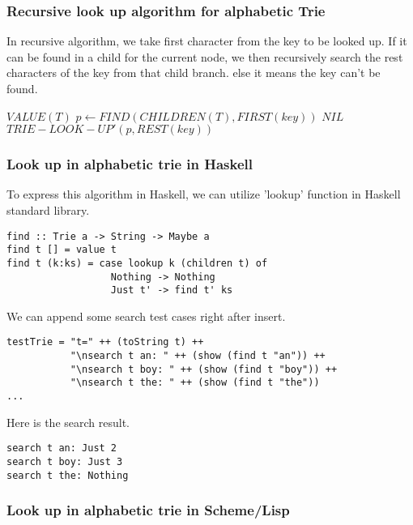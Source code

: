 \documentclass{article}
\begin{document}
\subsubsection{Recursive look up algorithm for alphabetic Trie}

In recursive algorithm, we take first character from the key to be
looked up. If it can be found in a child for the current node, we then
recursively search the rest characters of the key from that child
branch. else it means the key can't be found.

\begin{algorithmic}[1]
    \State \Return $VALUE(T)$
  \EndIf
  \State $p \leftarrow FIND(CHILDREN(T), FIRST(key))$
    \State \Return $NIL$
  \Else
    \State \Return $TRIE-LOOK-UP'(p, REST(key))$
  \EndIf
\EndFunction
\end{algorithmic}

\subsubsection*{Look up in alphabetic trie in Haskell}
To express this algorithm in Haskell, we can utilize 'lookup' function
in Haskell standard library\cite{wiki-trie}.

\lstset{language=Haskell}
\begin{lstlisting}
find :: Trie a -> String -> Maybe a
find t [] = value t
find t (k:ks) = case lookup k (children t) of
                  Nothing -> Nothing
                  Just t' -> find t' ks
\end{lstlisting}

We can append some search test cases right after insert.

\begin{lstlisting}
testTrie = "t=" ++ (toString t) ++
           "\nsearch t an: " ++ (show (find t "an")) ++
           "\nsearch t boy: " ++ (show (find t "boy")) ++
           "\nsearch t the: " ++ (show (find t "the"))
...
\end{lstlisting}

Here is the search result.

\begin{verbatim}
search t an: Just 2
search t boy: Just 3
search t the: Nothing
\end{verbatim}


\subsubsection*{Look up in alphabetic trie in Scheme/Lisp}
\end{document}
